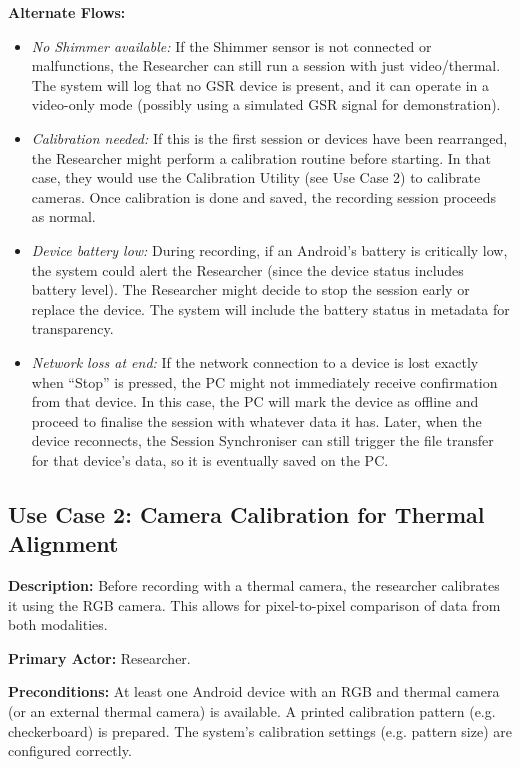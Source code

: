 \textbf{Alternate Flows:}
\begin{itemize}
    \item \emph{No Shimmer available:} If the Shimmer sensor is not connected or malfunctions, the Researcher can still run a session with just video/thermal. The system will log that no GSR device is present, and it can operate in a video-only mode (possibly using a simulated GSR signal for demonstration).
    \item \emph{Calibration needed:} If this is the first session or devices have been rearranged, the Researcher might perform a calibration routine before starting. In that case, they would use the Calibration Utility (see Use Case 2) to calibrate cameras. Once calibration is done and saved, the recording session proceeds as normal.
    \item \emph{Device battery low:} During recording, if an Android's battery is critically low, the system could alert the Researcher (since the device status includes battery level). The Researcher might decide to stop the session early or replace the device. The system will include the battery status in metadata for transparency.
    \item \emph{Network loss at end:} If the network connection to a device is lost exactly when ``Stop'' is pressed, the PC might not immediately receive confirmation from that device. In this case, the PC will mark the device as offline and proceed to finalise the session with whatever data it has. Later, when the device reconnects, the Session Synchroniser can still trigger the file transfer for that device's data, so it is eventually saved on the PC.
\end{itemize}

\subsection{Use Case 2: Camera Calibration for Thermal Alignment}
\textbf{Description:} Before recording with a thermal camera, the researcher calibrates it using the RGB camera. This allows for pixel-to-pixel comparison of data from both modalities.

\textbf{Primary Actor:} Researcher.

\textbf{Preconditions:} At least one Android device with an RGB and thermal camera (or an external thermal camera) is available. A printed calibration pattern (e.g. checkerboard) is prepared. The system's calibration settings (e.g. pattern size) are configured correctly.

